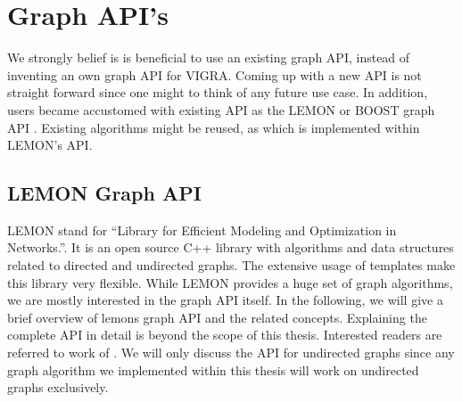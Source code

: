 
\section{Graph API's}\label{sec:graph_apis}



We strongly belief is is beneficial to use an existing graph API,
instead of inventing an own graph API for VIGRA.
Coming up with a new API is not straight forward
since one might to think of any future use case.
In addition, users became accustomed with existing API as 
the LEMON \citep{lemon_lib} or BOOST graph API \citep{ boost_bgl}.
Existing algorithms might be reused, as \cite{straehle_2011_miccai} which is implemented 
within LEMON's API.






\subsection{LEMON Graph API}\label{sec:lemon_graph_apis}
    LEMON \citep{ lemon_lib} 
    stand for  ``Library for Efficient Modeling and Optimization in Networks.''.
    It is an open source C++ library with algorithms and data structures 
    related to directed and undirected graphs.
    The extensive usage of templates make this library very flexible.
    While LEMON provides a huge set of graph algorithms,
    we are mostly interested in the graph API itself.
    In the following, we will give a brief overview of lemons graph 
    API and the related concepts.
    Explaining the complete  API in detail
    is beyond the scope of this thesis.
    Interested readers are referred to work of \citet{lemon_lib}.
    We will only discuss the API for undirected graphs since any
    graph algorithm we implemented within this thesis
    will work on undirected graphs exclusively.

